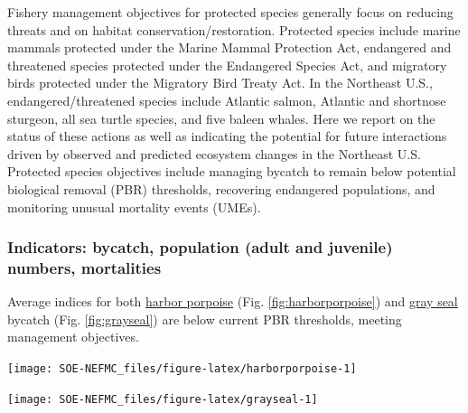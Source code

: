\documentclass[
  10pt,
]{article}
\let\origfigure\figure
\let\endorigfigure\endfigure
\renewenvironment{figure}[1][2] {
    \expandafter\origfigure\expandafter[H]
} {
    \endorigfigure
}
\begin{document}
Fishery management objectives for protected species generally focus on reducing threats and on habitat conservation/restoration. Protected species include marine mammals protected under the Marine Mammal Protection Act, endangered and threatened species protected under the Endangered Species Act, and migratory birds protected under the Migratory Bird Treaty Act. In the Northeast U.S., endangered/threatened species include Atlantic salmon, Atlantic and shortnose sturgeon, all sea turtle species, and five baleen whales. Here we report on the status of these actions as well as indicating the potential for future interactions driven by observed and predicted ecosystem changes in the Northeast U.S. Protected species objectives include managing bycatch to remain below potential biological removal (PBR) thresholds, recovering endangered populations, and monitoring unusual mortality events (UMEs).

\hypertarget{indicators-bycatch-population-adult-and-juvenile-numbers-mortalities}{%
\subsubsection{Indicators: bycatch, population (adult and juvenile) numbers, mortalities}\label{indicators-bycatch-population-adult-and-juvenile-numbers-mortalities}}

Average indices for both \href{https://noaa-edab.github.io/catalog/harbor-porpoise-bycatch.html}{harbor porpoise} (Fig. \ref{fig:harborporpoise}) and \href{https://noaa-edab.github.io/catalog/gray-seal-bycatch.html}{gray seal} bycatch (Fig. \ref{fig:grayseal}) are below current PBR thresholds, meeting management objectives.

\begin{figure}

{\centering \texttt{[image: SOE-NEFMC\_files/figure-latex/harborporpoise-1]} 

}

\caption{Harbor porpoise average bycatch estimate for Mid-Atlantic and New England gillnet fisheries (blue) and the potential biological removal (red).}\label{fig:harborporpoise}
\end{figure}
\begin{figure}

{\centering \texttt{[image: SOE-NEFMC\_files/figure-latex/grayseal-1]} 

}

\caption{Gray Seal average bycatch estimate for gillnet fisheries (blue) and the potential biological removal (red).}\label{fig:grayseal}
\end{figure}
\end{document}
